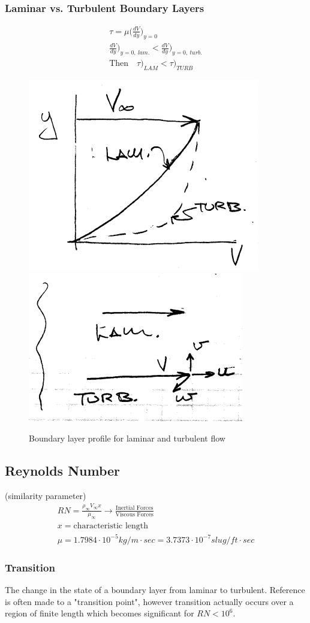 \documentclass[draft=false, titlepage]{article}
\begin{document}
\subsubsection{Laminar vs. Turbulent Boundary Layers}
\begin{gather*}
\tau = \mu \big(\frac{dV}{dy}\big)_{y=0}\\
\frac{dV}{dy}\big)_{y=0,\ lam.} < \frac{dV}{dy})_{y=0,\ turb.}\\
\text{Then}\quad \tau\big)_{LAM} < \tau\big)_{TURB}
\end{gather*}
\begin{figure}[ht]
	\centering
	\includegraphics[width=0.3\linewidth]{Figures/p17_velocityProfile2.PNG}
	\includegraphics[width=0.3\linewidth]{Figures/p17_velocityProfile3.PNG}
	\caption{Boundary layer profile for laminar and turbulent flow}
	\label{fig:p17_boundaryLayer23}
\end{figure}

\subsection{Reynolds Number} (similarity parameter)
\begin{gather}
RN = \frac{\rho_\infty V_\infty x}{\mu_\infty} \rightarrow \frac{\text{Inertial Forces}}{\text{Viscous Forces}}\\
x = \text{characteristic length}\\
\mu = 1.7984\cdot 10^{-5} kg/m\cdot sec = 3.7373 \cdot 10^{-7} slug/ft\cdot sec
\label{eq:Reynolds}
\end{gather}
\subsubsection{Transition}
The change in the state of a boundary layer from laminar to turbulent. Reference is often made to a "transition point", however transition actually occurs over a region of finite length which becomes significant for $RN < 10^6$.
\end{document}
